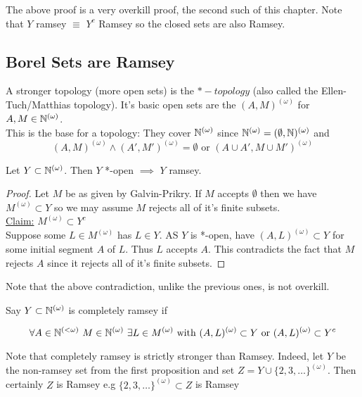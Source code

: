 \documentclass[a4paper]{article}
\newcommand{\Nomega}{\N^{(\omega)}}
\newcommand{\Momega}{M^{(\omega)}}
\newcommand{\Nfinite}{\N^{(< \omega)}}
\begin{document}
  The above proof is a very overkill proof, the second such of this chapter.
  Note that $Y$ ramsey $\equiv$ $Y^c$ Ramsey so the closed sets are also Ramsey.
  \subsection{Borel Sets are Ramsey}
  A stronger topology (more open sets) is the $*-topology$ (also called the
  Ellen-Tuch/Matthias topology). It's basic open sets are the $(A,
  M)^{(\omega)}$ for $A,M \in \Nomega$.\\
  This is the base for a topology: They cover $\Nomega$ since $\Nomega =
  (\emptyset, \N)^{(\omega)}$ and
  \[(A, M)^{(\omega)} \wedge (A', M')^{(\omega)} = \emptyset \text{ or } (A \cup
    A', M \cup M')^{(\omega)}\]
  \begin{thm}
    Let $Y \subset \Nomega$. Then $Y$ *-open $\implies$ $Y$ ramsey.
  \end{thm}
  \begin{proof}
    Let $M$ be as given by Galvin-Prikry. If $M$ accepts $\emptyset$ then we
    have $\Momega \subset Y$ so we may assume $M$ rejects all of it's finite
    subsets.\\
    \underline{Claim:} $\Momega \subset Y^c$\\
    Suppose some $L \in \Momega$ has $L \in Y$. AS $Y$ is *-open, have
    $(A,L)^{(\omega)} \subset Y$ for some initial segment $A$ of $L$. Thus $L$
    accepts $A$. This contradicts the fact that $M$ rejects $A$ since it rejects
    all of it's finite subsets.
  \end{proof}
  Note that the above contradiction, unlike the previous ones, is not
  overkill.\\
  \begin{defi}
    Say $Y \subset \Nomega$ is completely ramsey if

    \[\forall A \in \Nfinite \ M \in \Nomega \ \exists L \in \Momega \text{ with
      } (A,L)^{(\omega)} \subset Y \text{ or } (A,L)^{(\omega)} \subset Y^c\]
  \end{defi}
  Note that completely ramsey is strictly stronger than Ramsey. Indeed, let $Y$
  be the non-ramsey set from the first proposition and set $Z = Y \cup
  \{2,3,\dots\}^{(\omega)}$. Then certainly $Z$ is Ramsey e.g $\{2,3,\dots
  \}^{(\omega)} \subset Z$ is Ramsey
  \printindex
\end{document}
